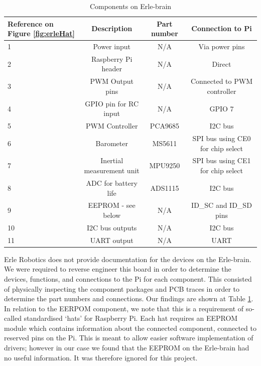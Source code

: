 \documentclass[capstone_report.tex]{subfiles}
\begin{document}
    \begin{table}[H]
    \centering
        \begin{tabular}{|p{1.8cm}|c|c|c|}
            \hline
            Reference on Figure \ref{fig:erleHat} & Description & Part number & Connection to Pi\\
            \hline
            1 & Power input & N/A & Via power pins \\
            2 & Raspberry Pi header & N/A & Direct \\
            3 & PWM Output pins & N/A & Connected to PWM controller \\
            4 & GPIO pin for RC input & N/A & GPIO 7 \\
            5 & PWM Controller & PCA9685 & I2C bus \\
            6 & Barometer & MS5611 & SPI bus using CE0 for chip select\\
            7 & Inertial measurement unit & MPU9250 & SPI bus using CE1 for chip select\\
            8 & ADC for battery life & ADS1115 & I2C bus \\
            9 & EEPROM - see below & N/A & ID\_SC and ID\_SD pins\\
            10 & I2C bus outputs & N/A & I2C bus \\
            11 & UART output & N/A & UART \\
            \hline
        \end{tabular}
    \caption{Components on Erle-brain\label{tab:ebcomponents}}
    \end{table}

    Erle Robotics does not provide documentation for the devices on the Erle-brain. We were required to reverse engineer this board in order to determine the devices, functions, and connections to the Pi for each component. This consisted of physically inspecting the component packages and PCB traces in order to determine the part numbers and connections. Our findings are shown at Table \ref{tab:ebcomponents}.\\

    In relation to the EERPOM component, we note that this is a requirement of so-called standardised `hats' for Raspberry Pi. Each hat requires an EEPROM module which contains information about the connected component, connected to reserved pins on the Pi. This is meant to allow easier software implementation of drivers; however in our case we found that the EEPROM on the Erle-brain had no useful information. It was therefore ignored for this project.\\
\end{document}
